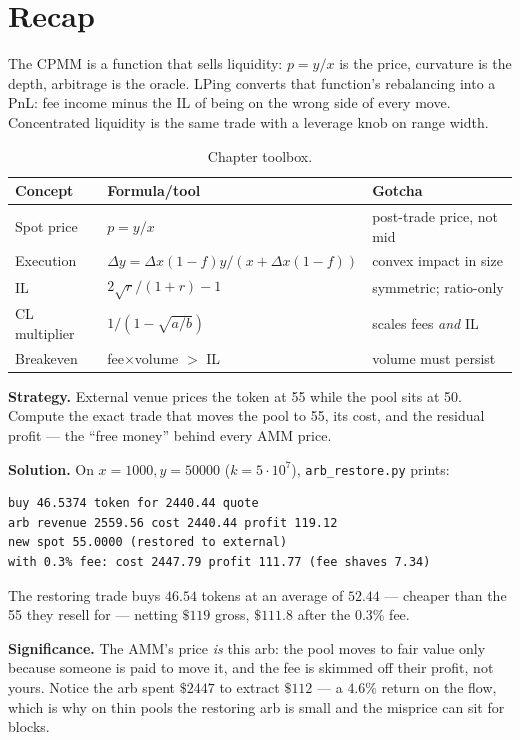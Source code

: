 \section{Recap}\label{sec:ammrecap}

The CPMM is a function that sells liquidity: $p=y/x$ is the price, curvature is the depth,
arbitrage is the oracle. LPing converts that function's rebalancing into a PnL: fee income
minus the IL of being on the wrong side of every move. Concentrated liquidity is the same
trade with a leverage knob on range width.

\begin{table}[htbp]\centering\small
\caption{Chapter toolbox.}
\begin{tabular}{@{}lll@{}}
\toprule
Concept & Formula/tool & Gotcha\\
\midrule
Spot price & $p=y/x$ & post-trade price, not mid\\
Execution & $\Delta y=\Delta x(1-f)y/(x+\Delta x(1-f))$ & convex impact in size\\
IL & $2\sqrt r/(1+r)-1$ & symmetric; ratio-only\\
CL multiplier & $1/(1-\sqrt{a/b})$ & scales fees \emph{and} IL\\
Breakeven & fee$\times$volume $>$ IL & volume must persist\\
\bottomrule
\end{tabular}
\end{table}

\begin{example}\label{ex:arb}
\textbf{Strategy.} External venue prices the token at 55 while the
pool sits at 50. Compute the exact trade that moves the pool to 55,
its cost, and the residual profit --- the ``free money'' behind
every AMM price.

\textbf{Solution.} On $x=1000,y=50000$ ($k=5\cdot10^7$),
\texttt{arb\_restore.py} prints:
\begin{verbatim}
buy 46.5374 token for 2440.44 quote
arb revenue 2559.56 cost 2440.44 profit 119.12
new spot 55.0000 (restored to external)
with 0.3% fee: cost 2447.79 profit 111.77 (fee shaves 7.34)
\end{verbatim}
The restoring trade buys $46.54$ tokens at an average of $52.44$ ---
cheaper than the 55 they resell for --- netting $\$119$ gross,
$\$111.8$ after the 0.3\% fee.

\textbf{Significance.} The AMM's price \emph{is} this arb: the pool
moves to fair value only because someone is paid to move it, and the
fee is skimmed off their profit, not yours. Notice the arb spent
$\$2447$ to extract $\$112$ --- a $4.6\%$ return on the flow, which
is why on thin pools the restoring arb is small and the misprice
can sit for blocks.
\end{example}

